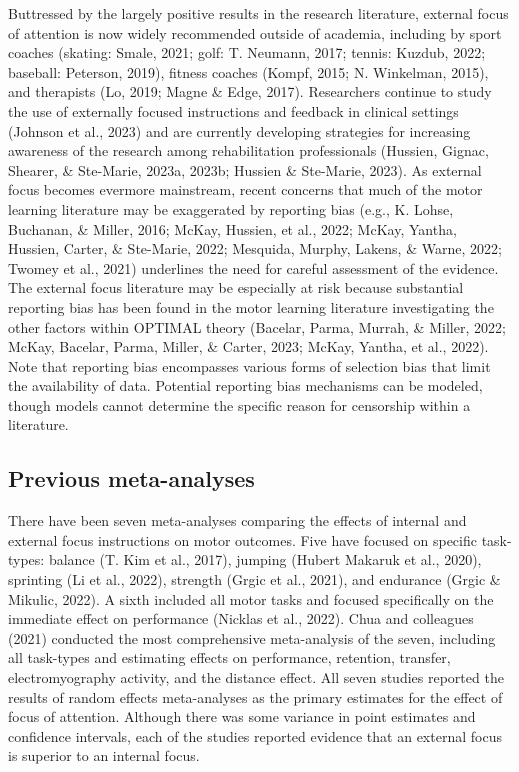 \documentclass[
  man, donotrepeattitle,floatsintext]{apa7}
\begin{document}
Buttressed by the largely positive results in the research literature, external focus of attention is now widely recommended outside of academia, including by sport coaches (skating: Smale, 2021; golf: T. Neumann, 2017; tennis: Kuzdub, 2022; baseball: Peterson, 2019), fitness coaches (Kompf, 2015; N. Winkelman, 2015), and therapists (Lo, 2019; Magne \& Edge, 2017). Researchers continue to study the use of externally focused instructions and feedback in clinical settings (Johnson et al., 2023) and are currently developing strategies for increasing awareness of the research among rehabilitation professionals (Hussien, Gignac, Shearer, \& Ste-Marie, 2023a, 2023b; Hussien \& Ste-Marie, 2023). As external focus becomes evermore mainstream, recent concerns that much of the motor learning literature may be exaggerated by reporting bias (e.g., K. Lohse, Buchanan, \& Miller, 2016; McKay, Hussien, et al., 2022; McKay, Yantha, Hussien, Carter, \& Ste-Marie, 2022; Mesquida, Murphy, Lakens, \& Warne, 2022; Twomey et al., 2021) underlines the need for careful assessment of the evidence. The external focus literature may be especially at risk because substantial reporting bias has been found in the motor learning literature investigating the other factors within OPTIMAL theory (Bacelar, Parma, Murrah, \& Miller, 2022; McKay, Bacelar, Parma, Miller, \& Carter, 2023; McKay, Yantha, et al., 2022). Note that reporting bias encompasses various forms of selection bias that limit the availability of data. Potential reporting bias mechanisms can be modeled, though models cannot determine the specific reason for censorship within a literature.

\hypertarget{previous-meta-analyses}{%
\subsection{Previous meta-analyses}\label{previous-meta-analyses}}

There have been seven meta-analyses comparing the effects of internal and external focus instructions on motor outcomes. Five have focused on specific task-types: balance (T. Kim et al., 2017), jumping (Hubert Makaruk et al., 2020), sprinting (Li et al., 2022), strength (Grgic et al., 2021), and endurance (Grgic \& Mikulic, 2022). A sixth included all motor tasks and focused specifically on the immediate effect on performance (Nicklas et al., 2022). Chua and colleagues (2021) conducted the most comprehensive meta-analysis of the seven, including all task-types and estimating effects on performance, retention, transfer, electromyography activity, and the distance effect. All seven studies reported the results of random effects meta-analyses as the primary estimates for the effect of focus of attention. Although there was some variance in point estimates and confidence intervals, each of the studies reported evidence that an external focus is superior to an internal focus.
\end{document}
